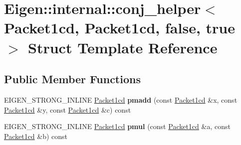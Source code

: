 \hypertarget{struct_eigen_1_1internal_1_1conj__helper_3_01_packet1cd_00_01_packet1cd_00_01false_00_01true_01_4}{}\section{Eigen\+:\+:internal\+:\+:conj\+\_\+helper$<$ Packet1cd, Packet1cd, false, true $>$ Struct Template Reference}
\label{struct_eigen_1_1internal_1_1conj__helper_3_01_packet1cd_00_01_packet1cd_00_01false_00_01true_01_4}
\subsection*{Public Member Functions}
\begin{DoxyCompactItemize}
\item 
\mbox{\label{struct_eigen_1_1internal_1_1conj__helper_3_01_packet1cd_00_01_packet1cd_00_01false_00_01true_01_4_a239ba231d08da7038b01908334bef352}} 
E\+I\+G\+E\+N\+\_\+\+S\+T\+R\+O\+N\+G\+\_\+\+I\+N\+L\+I\+NE \hyperlink{struct_eigen_1_1internal_1_1_packet1cd}{Packet1cd} {\bfseries pmadd} (const \hyperlink{struct_eigen_1_1internal_1_1_packet1cd}{Packet1cd} \&x, const \hyperlink{struct_eigen_1_1internal_1_1_packet1cd}{Packet1cd} \&y, const \hyperlink{struct_eigen_1_1internal_1_1_packet1cd}{Packet1cd} \&c) const
\item 
\mbox{\label{struct_eigen_1_1internal_1_1conj__helper_3_01_packet1cd_00_01_packet1cd_00_01false_00_01true_01_4_a077ec7bf6ea716ab78494320e7a6e085}} 
E\+I\+G\+E\+N\+\_\+\+S\+T\+R\+O\+N\+G\+\_\+\+I\+N\+L\+I\+NE \hyperlink{struct_eigen_1_1internal_1_1_packet1cd}{Packet1cd} {\bfseries pmul} (const \hyperlink{struct_eigen_1_1internal_1_1_packet1cd}{Packet1cd} \&a, const \hyperlink{struct_eigen_1_1internal_1_1_packet1cd}{Packet1cd} \&b) const
\item 
\mbox{\label{struct_eigen_1_1internal_1_1conj__helper_3_01_packet1cd_00_01_packet1cd_00_01false_00_01true_01_4_a239ba231d08da7038b01908334bef352}} 

\end{DoxyCompactItemize}
